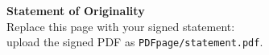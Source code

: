 \clearpage
\thispagestyle{empty}
\vspace*{\fill}
\begin{center}
{\Large \textbf{Statement of Originality}}\\[1cm]
Replace this page with your signed statement:\\
upload the signed PDF as \texttt{PDFpage/statement.pdf}.
\end{center}
\vspace*{\fill}
\clearpage
